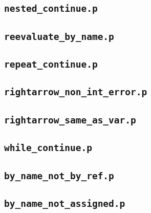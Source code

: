 \documentclass[a4paper,9pt]{article}
\begin{document}
\begin{multicols}{2}
\subsection{\textbf{\texttt{nested\_continue.p}}}


\subsection{\textbf{\texttt{reevaluate\_by\_name.p}}}


\subsection{\textbf{\texttt{repeat\_continue.p}}}


\subsection{\textbf{\texttt{rightarrow\_non\_int\_error.p}}}


\subsection{\textbf{\texttt{rightarrow\_same\_as\_var.p}}}


\subsection{\textbf{\texttt{while\_continue.p}}}


\subsection{\textbf{\texttt{by\_name\_not\_by\_ref.p}}}


\subsection{\textbf{\texttt{by\_name\_not\_assigned.p}}}


\end{multicols}
\end{document}
